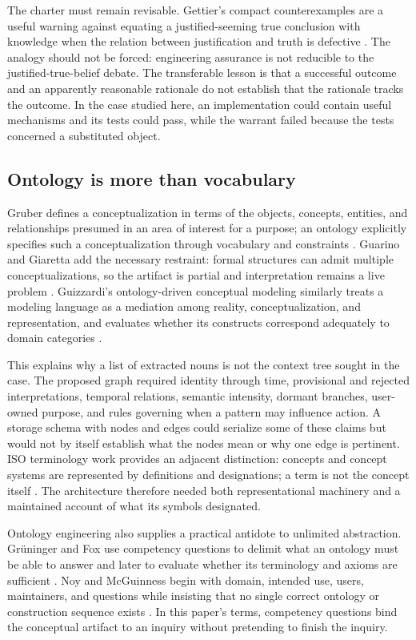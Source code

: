 \documentclass[10pt,a4paper]{article}
\begin{document}
The charter must remain revisable. Gettier's compact counterexamples are a useful warning against equating a justified-seeming true conclusion with knowledge when the relation between justification and truth is defective \cite{gettier1963}. The analogy should not be forced: engineering assurance is not reducible to the justified-true-belief debate. The transferable lesson is that a successful outcome and an apparently reasonable rationale do not establish that the rationale tracks the outcome. In the case studied here, an implementation could contain useful mechanisms and its tests could pass, while the warrant failed because the tests concerned a substituted object.

\subsection{Ontology is more than vocabulary}

Gruber defines a conceptualization in terms of the objects, concepts, entities, and relationships presumed in an area of interest for a purpose; an ontology explicitly specifies such a conceptualization through vocabulary and constraints \cite{gruber1993}. Guarino and Giaretta add the necessary restraint: formal structures can admit multiple conceptualizations, so the artifact is partial and interpretation remains a live problem \cite{guarino1995}. Guizzardi's ontology-driven conceptual modeling similarly treats a modeling language as a mediation among reality, conceptualization, and representation, and evaluates whether its constructs correspond adequately to domain categories \cite{guizzardi2005}.

This explains why a list of extracted nouns is not the context tree sought in the case. The proposed graph required identity through time, provisional and rejected interpretations, temporal relations, semantic intensity, dormant branches, user-owned purpose, and rules governing when a pattern may influence action. A storage schema with nodes and edges could serialize some of these claims but would not by itself establish what the nodes mean or why one edge is pertinent. ISO terminology work provides an adjacent distinction: concepts and concept systems are represented by definitions and designations; a term is not the concept itself \cite{iso704}. The architecture therefore needed both representational machinery and a maintained account of what its symbols designated.

Ontology engineering also supplies a practical antidote to unlimited abstraction. Gr\"uninger and Fox use competency questions to delimit what an ontology must be able to answer and later to evaluate whether its terminology and axioms are sufficient \cite{gruninger1995}. Noy and McGuinness begin with domain, intended use, users, maintainers, and questions while insisting that no single correct ontology or construction sequence exists \cite{noy2001}. In this paper's terms, competency questions bind the conceptual artifact to an inquiry without pretending to finish the inquiry.
\end{document}
